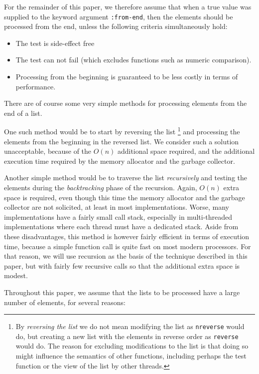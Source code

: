 For the remainder of this paper, we therefore assume that when a true
value was supplied to the keyword argument \texttt{:from-end}, then
the elements should be processed from the end, unless the following
criteria simultaneously hold:

\begin{itemize}
\item The test is side-effect free
\item The test can not fail (which excludes functions such as numeric
  comparison).
\item Processing from the beginning is guaranteed to be less costly in
  terms of performance.
\end{itemize}

There are of course some very simple methods for processing elements
from the end of a list.

One such method would be to start by reversing the list%
\footnote{By \emph{reversing the list} we do not mean modifying the
  list as \texttt{nreverse} would do, but creating a new list with the
  elements in reverse order as \texttt{reverse} would do.  The reason
  for excluding modifications to the list is that doing so might
  influence the semantics of other functions, including perhaps the
  test function or the view of the list by other threads.}
and processing the elements from the beginning in the reversed list.
We consider such a solution unacceptable, because of the $O(n)$
additional space required, and the additional execution time required
by the memory allocator and the garbage collector.

Another simple method would be to traverse the list \emph{recursively}
and testing the elements during the \emph{backtracking} phase of the
recursion.  Again, $O(n)$ extra space is required, even though this
time the memory allocator and the garbage collector are not solicited,
at least in most implementations.  Worse, many implementations have a
fairly small call stack, especially in multi-threaded implementations
where each thread must have a dedicated stack.  Aside from these
disadvantages, this method is however fairly efficient in terms of
execution time, because a simple function call is quite fast on most
modern processors.  For that reason, we will use recursion as the
basis of the technique described in this paper, but with fairly few
recursive calls so that the additional extra space is modest.

Throughout this paper, we assume that the lists to be processed have a
large number of elements, for several reasons:

